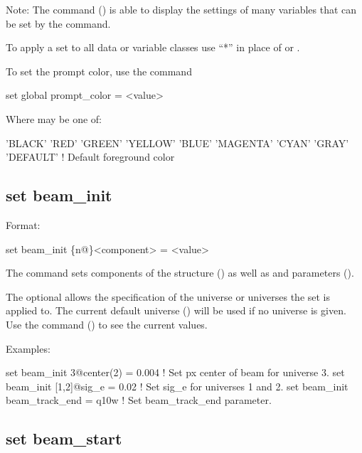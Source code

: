 {{Note: The  command () is able to display the settings of many variables
that can be set by the  command.

To apply a set to all data or variable classes use ``*'' in place of  or
.

To set the prompt color, use the command
\begin{example}
  set global prompt_color = <value>
\end{example}
Where  may be one of:
\begin{example}
  'BLACK'
  'RED'
  'GREEN'
  'YELLOW'
  'BLUE'
  'MAGENTA'
  'CYAN'
  'GRAY'
  'DEFAULT'       ! Default foreground color
\end{example}



\subsection{set beam_init}
\label{s:set.beam.init}

Format:
\begin{example}
  set beam_init \{n@\}<component> = <value>
\end{example}

The  command sets components of the  structure ()
as well as  and  parameters ().

The optional  allows the specification of the universe or universes the set is applied
to. The current default universe () will be used if no universe is given. Use the
 command () to see the current values.

Examples:
\begin{example}
  set beam_init 3@center(2) = 0.004   ! Set px center of beam for universe 3.
  set beam_init [1,2]@sig_e = 0.02    ! Set sig_e for universes 1 and 2.
  set beam_init beam_track_end = q10w ! Set beam_track_end parameter.
\end{example}


\subsection{set beam_start}
\label{s:set.beam.start}

}}
